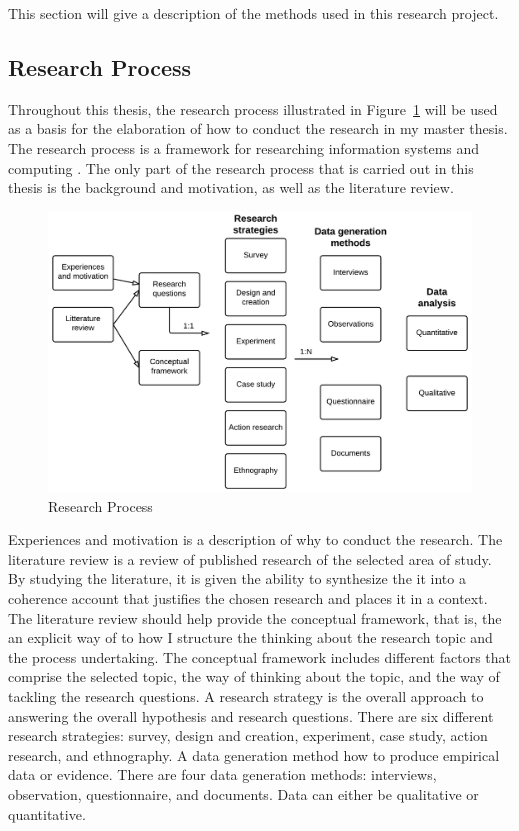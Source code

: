   This section will give a description of the methods used in this research project. 

    \subsection{Research Process} \label{sec:methodresearchprocess}

    Throughout this thesis, the research process illustrated in Figure~\ref{fig:researchProcess1} will be used as a basis for the elaboration of how to conduct the research in my master thesis. The research process is a framework for researching information systems and computing \cite{empiriske}. The only part of the research process that is carried out in this thesis is the background and motivation, as well as the literature review.

      \begin{figure}[H]
        \centering
        \includegraphics[scale=0.18]{pics/ResearchProcess.png}
        \caption[Research process]{Research Process \cite{empiriske}}
        \label{fig:researchProcess1}
      \end{figure}

    Experiences and motivation is a description of why to conduct the research. The literature review is a review of published research of the selected area of study. By studying the literature, it is given the ability to synthesize the it into a coherence account that justifies the chosen research and places it in a context. The literature review should help provide the conceptual framework, that is, the an explicit way of to how I structure the thinking about the research topic and the process undertaking. The conceptual framework includes different factors that comprise the selected topic, the way of thinking about the topic, and the way of tackling the research questions. A research strategy is the overall approach to answering the overall hypothesis and research questions. There are six different research strategies: survey, design and creation, experiment, case study, action research, and ethnography. A data generation method how to produce empirical data or evidence. There are four data generation methods: interviews, observation, questionnaire, and documents. Data can either be qualitative or quantitative. 

